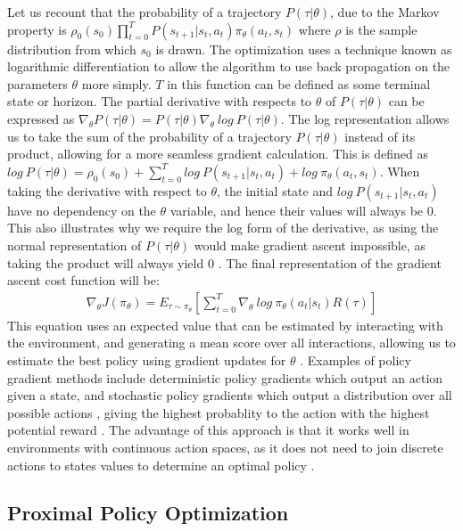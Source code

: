 \documentclass[a4paper,twoside,12pt]{report}
\begin{document}
Let us recount that the probability of a trajectory $P(\tau|\theta)$, due to the Markov property is $\rho_0 (s_0)\prod^{T}_{t=0} P(s_{t+1}|s_t,a_t)\pi_{\theta}(a_t,s_t)$ where $\rho$ is the sample distribution from which $s_0$ is drawn. The optimization uses a technique known as logarithmic differentiation to allow the algorithm to use back propagation on the parameters $\theta$ more simply. $T$ in this function can be defined as some terminal state or horizon. The partial derivative with respects to $\theta$ of $P(\tau|\theta)$ can be expressed as $\nabla_\theta P(\tau|\theta) = P(\tau|\theta)\nabla_\theta \: log \: P(\tau|\theta)$. The log representation allows us to take the sum of the probability of a trajectory $P(\tau|\theta)$ instead of its product, allowing for a more seamless gradient calculation. This is defined as  $log \: P(\tau|\theta) = \rho_0(s_0) + \sum^{T}_{t=0} log \: P(s_{t+1}|s_t,a_t) + log \: \pi_{\theta}(a_t,s_t)$. When taking the derivative with respect to $\theta$, the initial state and $log\: P(s_{t+1}|s_t,a_t)$ have no dependency on the $\theta$ variable, and hence their values will always be $0$. This also illustrates why we require the log form of the derivative, as using the normal representation of $P(\tau|\theta)$ would make gradient ascent impossible, as taking the product will always yield $0$ \citep{policygrad}. The final representation of the gradient ascent cost function will be:
\begin{align}
    \nabla_\theta J(\pi_\theta) = E_{\tau \sim \pi_\theta}\left[ \sum^{T}_{t=0} \nabla_\theta \: log \: \pi_{\theta}(a_t|s_t) R(\tau) \right]
\end{align}
This equation uses an expected value that can be estimated by interacting with the environment, and generating a mean score over all  interactions, allowing us to estimate the best policy using gradient updates for $\theta$ \citep{policygrad}. Examples of policy gradient methods include deterministic policy gradients which output an action given a state, and stochastic policy gradients which output a distribution over all possible actions , giving the highest probablity to the action with the highest potential reward \citep{moderndrl}. The advantage of this approach is that it works well in environments with continuous action spaces, as it does not need to join discrete actions to states values to determine an optimal policy \citep{moderndrl}.

\subsection{Proximal Policy Optimization}
\label{ppo} 
\end{document}
